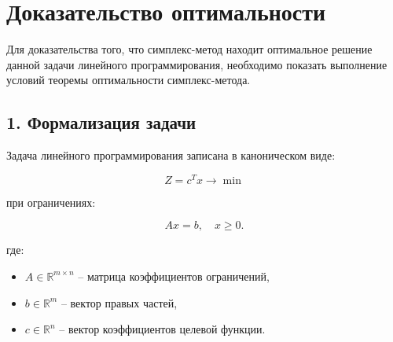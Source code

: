 \section{Доказательство оптимальности}
%
%
%

Для доказательства того, что симплекс-метод находит оптимальное решение данной задачи линейного программирования, необходимо показать выполнение условий теоремы оптимальности симплекс-метода.

\subsection*{1. Формализация задачи}
Задача линейного программирования записана в каноническом виде:

$$Z = c^T x \rightarrow \min$$

при ограничениях:

$$Ax = b, \quad x \geq 0.$$

где:
\begin{itemize}
    \item $A \in \mathbb{R}^{m \times n}$ – матрица коэффициентов ограничений,
    \item $b \in \mathbb{R}^m$ – вектор правых частей,
    \item $c \in \mathbb{R}^n$ – вектор коэффициентов целевой функции.
\end{itemize}

